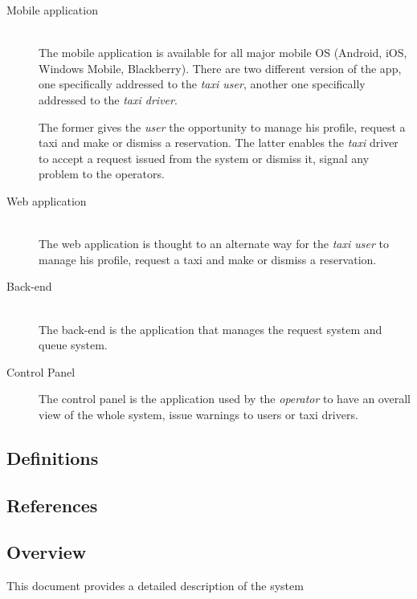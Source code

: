 \documentclass[12pt]{article}
\begin{document}
\begin{description}
  \item[Mobile application] \hfill \\
  The mobile application is available for all major mobile OS (Android, iOS, Windows Mobile, Blackberry).
  There are two different version of the app, one specifically addressed to the \emph{taxi user}, another one specifically addressed to the \emph{taxi driver}.

  The former gives the \emph{user} the opportunity to manage his profile, request a taxi and make or dismiss a reservation.
  The latter enables the \emph{taxi} driver to accept a request issued from the system or dismiss it, signal any problem to the operators.

  \item[Web application] \hfill \\
  The web application is thought to an alternate way for the \emph{taxi user} to manage his profile, request a taxi and make or dismiss a reservation.

  \item[Back-end] \hfill \\
  The back-end is the application that manages the request system and queue system.

  \item[Control Panel]
  The control panel is the application used by the \emph{operator} to have an overall view of the whole system, issue warnings to users or taxi drivers.
  
\end{description}

\subsection{Definitions}

\subsection{References}

\subsection{Overview}
This document provides a detailed description of the system 
\end{document}
